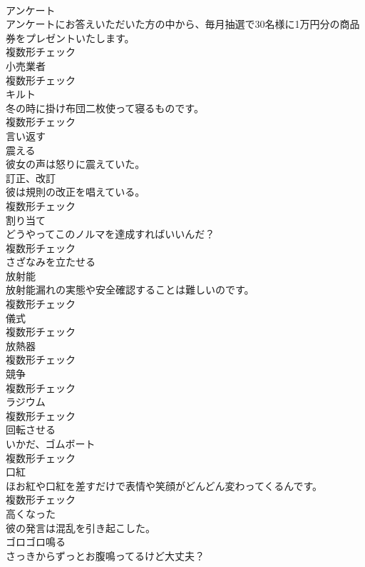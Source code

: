 \documentclass[8pt]{extreport}
\begin{document}
\begin{CJK}{UTF8}{min}
\\	[名詞]	アンケート	
\\	アンケートにお答えいただいた方の中から、毎月抽選で30名様に1万円分の商品券をプレゼントいたします。	
\\	複数形チェック
\\	[名詞]	小売業者	
\\	複数形チェック
\\	[名詞]	キルト	
\\	冬の時に掛け布団二枚使って寝るものです。	
\\	複数形チェック
\\	[動詞]	言い返す	
\\	[動詞]	震える	
\\	彼女の声は怒りに震えていた。	
\\	[名詞]	訂正、改訂	
\\	彼は規則の改正を唱えている。	
\\	複数形チェック
\\	[名詞]	割り当て	
\\	どうやってこのノルマを達成すればいいんだ？	
\\	複数形チェック
\\	[動詞]	さざなみを立たせる	
\\	[名詞]	放射能	
\\	放射能漏れの実態や安全確認することは難しいのです。	
\\	複数形チェック
\\	[名詞]	儀式	
\\	複数形チェック
\\	[名詞]	放熱器	
\\	複数形チェック
\\	[名詞]	競争	
\\	複数形チェック
\\	[名詞]	ラジウム	
\\	複数形チェック
\\	[動詞]	回転させる	
\\	[名詞]	いかだ、ゴムボート	
\\	複数形チェック
\\	[名詞]	口紅	
\\	ほお紅や口紅を差すだけで表情や笑顔がどんどん変わってくるんです。	
\\	複数形チェック
\\	[形容詞]	高くなった	
\\	彼の発言は混乱を引き起こした。	
\\	[動詞]	ゴロゴロ鳴る	
\\	さっきからずっとお腹鳴ってるけど大丈夫？	

\end{CJK}
\end{document}
